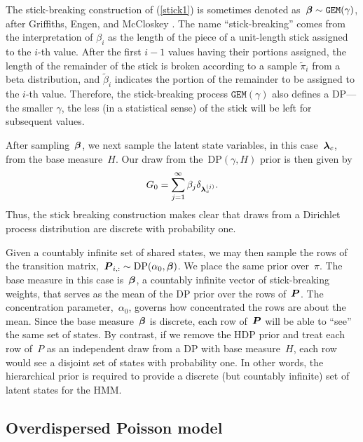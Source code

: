 The stick-breaking construction of (\ref{stick1}) is sometimes denoted as~${\boldsymbol{\beta} \sim \texttt{GEM}(\gamma)}$, after Griffiths, Engen, and McCloskey \citep{Ewens90}. 
The name ``stick-breaking'' comes from the interpretation of $\beta_i$ as the length of the piece of a unit-length stick assigned to the $i$-th value.
After the first $i-1$ values having their portions assigned, the length of the remainder of the stick is broken according  to a sample $\tilde{\pi}_i$
from a beta distribution, and $\tilde{\beta}_i$ indicates the portion of the remainder to be assigned to the $i$-th value. Therefore, the stick-breaking process $\texttt{GEM}(\gamma)$ also defines a DP---the smaller $\gamma$, the less (in a statistical sense) 
of the stick will be left for subsequent values. 

After sampling~$\boldsymbol{\beta}$, we next sample the latent state variables, in this case~${\boldsymbol{\lambda}_c}$, from the base measure~$H$. Our draw from the~${\mathrm{DP}(\gamma,H)}$ prior is then given by
\begin{align}
G_0=\sum_{j=1}^\infty \beta_j \delta_{\boldsymbol{\lambda}_{c}^{(j)}}.
\end{align}
Thus, the stick breaking construction makes clear that draws from a Dirichlet process distribution are discrete with probability one.

Given a countably infinite set of shared states, we may then sample the rows of the transition matrix,~${\boldsymbol{P}_{i,:}\sim\mathrm{DP}(\alpha_0,\boldsymbol{\beta})}$. We place the same prior over~$\pi$.  The base measure in this case is~$\boldsymbol{\beta}$, a countably infinite vector of stick-breaking weights, that serves as the mean of the DP prior over the rows of~$\boldsymbol{P}$. The concentration parameter,~$\alpha_0$, governs how concentrated the rows are about the mean. Since the base measure~$\boldsymbol{\beta}$ is discrete, each row of~$\boldsymbol{P}$ will be able to ``see'' the same set of states. By contrast, if we remove the HDP prior and treat each row of~$P$ as an independent draw from a DP with base measure~$H$, each row would see a disjoint set of states with probability one. In other words, the hierarchical prior is required to provide a discrete (but countably infinite) set of latent states for the HMM.

\subsection{Overdispersed Poisson model}


